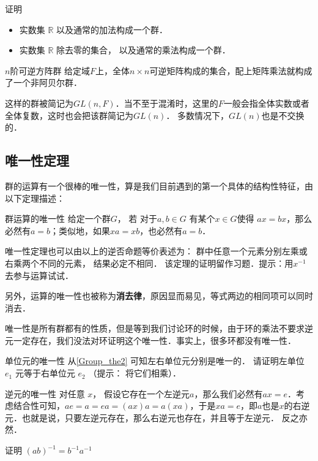 \begin{exercise}{}
证明
\begin{itemize}
\item 实数集 $\mathbb R$ 以及通常的加法构成一个群．
\item 实数集 $\mathbb R$ 除去零的集合， 以及通常的乘法构成一个群．
\end{itemize}
\end{exercise}

\begin{example}{$n$阶可逆方阵群}\label{Group_ex5}
给定域$F$上，全体$n\times n$可逆矩阵构成的集合，配上矩阵乘法就构成了一个非阿贝尔群．%

这样的群被简记为$GL(n, F)$．当不至于混淆时，这里的$F$一般会指全体实数或者全体复数，这时也会把该群简记为$GL(n)$． 多数情况下，$GL(n)$也是不交换的．
\end{example}

\subsection{唯一性定理}

群的运算有一个很棒的唯一性，算是我们目前遇到的第一个具体的结构性特征，由以下定理描述：

\begin{theorem}{群运算的唯一性}\label{Group_the2}
给定一个群$G$， 若 对于$ a, b\in G$ 有某个$x\in G$使得 $ax=bx$，那么必然有$a=b$；类似地，如果$xa=xb$，也必然有$a=b$．
\end{theorem}

唯一性定理也可以由以上的逆否命题等价表述为： 群中任意一个元素分别左乘或右乘两个不同的元素， 结果必定不相同． 该定理的证明留作习题．提示：用$x^{-1}$去参与运算试试．

另外，运算的唯一性也被称为\textbf{消去律}，原因显而易见，等式两边的相同项可以同时消去．

唯一性是所有群都有的性质，但是等到我们讨论环的时候，由于环的乘法不要求逆元一定存在，我们没法对环证明这个唯一性．事实上，很多环都没有唯一性．

\begin{exercise}{单位元的唯一性}
从\autoref{Group_the2} 可知左右单位元分别是唯一的． 请证明左单位 $e_1$ 元等于右单位元 $e_2$ （提示： 将它们相乘）．
\end{exercise}

\begin{theorem}{逆元的唯一性}\label{Group_the1}
对任意 $x$， 假设它存在一个左逆元$a$，那么我们必然有$ax=e$．考虑结合性可知，$ae=a=ea=(ax)a=a(xa)$，于是$xa=e$，即$a$也是$x$的右逆元．也就是说，只要左逆元存在，那么右逆元也存在，并且等于左逆元． 反之亦然．
\end{theorem}

\begin{exercise}{}
证明 $(ab)^{-1} = b^{-1}a^{-1}$
\end{exercise}
